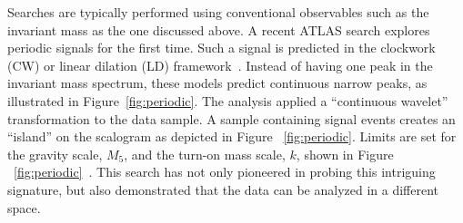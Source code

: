 \documentclass{moriond}
\begin{document}
Searches are typically performed using conventional observables such as the
invariant mass as the one discussed above. A recent ATLAS search explores
periodic signals for the first time. Such a signal is predicted in the
clockwork (CW) or linear dilation (LD) framework~\cite{clock}. Instead of
having one peak in the invariant mass spectrum, these models predict continuous
narrow peaks, as illustrated in Figure~\ref{fig:periodic}.
The analysis applied a ``continuous wavelet'' transformation to the data
sample. A sample containing signal events creates an ``island'' on the
scalogram as depicted in Figure ~\ref{fig:periodic}. Limits
are set for the gravity scale, $M_{5}$, and the turn-on mass scale, $k$, shown
in Figure ~\ref{fig:periodic}~\cite{period}.  This search
has not only pioneered in probing this intriguing signature, but also
demonstrated that the data can be analyzed in a different space.\\        
\end{document}
